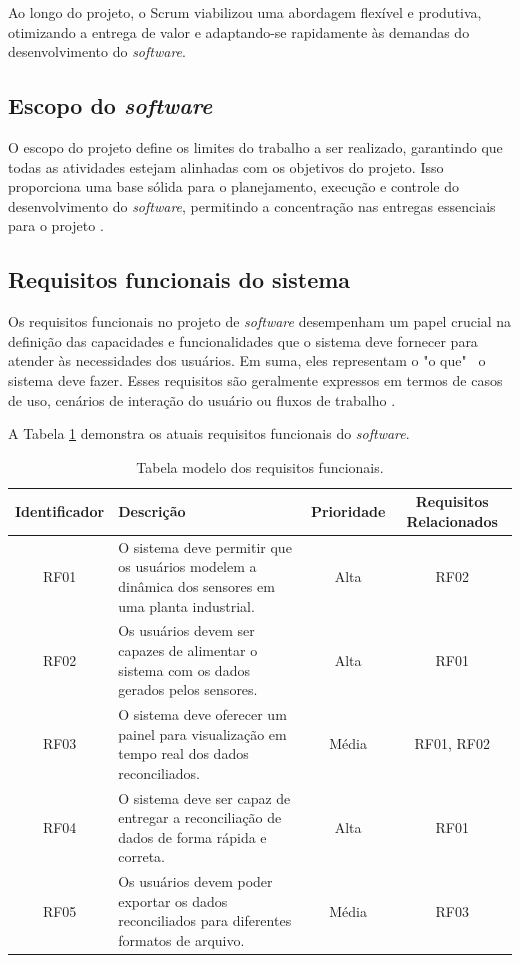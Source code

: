 Ao longo do projeto, o Scrum viabilizou uma abordagem flexível e produtiva, otimizando a entrega de valor e adaptando-se rapidamente às demandas do desenvolvimento do \textit{software}.

\subsection{Escopo do \textit{software}}

O escopo do projeto define os limites do trabalho a ser realizado, garantindo que todas as atividades estejam alinhadas com os objetivos do projeto. Isso proporciona uma base sólida para o planejamento, execução e controle do desenvolvimento do \textit{software}, permitindo a concentração nas entregas essenciais para o projeto \cite{softwareeng}.

\subsection{Requisitos funcionais do sistema}

Os requisitos funcionais no projeto de \textit{software} desempenham um papel crucial na definição das capacidades e funcionalidades que o sistema deve fornecer para atender às necessidades dos usuários. Em suma, eles representam o "o que" \ o sistema deve fazer. Esses requisitos são geralmente expressos em termos de casos de uso, cenários de interação do usuário ou fluxos de trabalho \cite{softwareengreq}.
        
A Tabela \ref{tab:req_funcional} demonstra os atuais requisitos funcionais do \textit{software}.

\begin{table}[htbp]
\centering
\begin{tabularx}{\linewidth}{|c|X|c|c|} \hline
\rowcolor[HTML]{C0C0C0} 
\textbf{Identificador} & \textbf{Descrição} & \textbf{Prioridade} & \textbf{Requisitos Relacionados} \\ \hline
RF01 & O sistema deve permitir que os usuários modelem a dinâmica dos sensores em uma planta industrial. & Alta & RF02 \\ \hline
RF02 & Os usuários devem ser capazes de alimentar o sistema com os dados gerados pelos sensores. & Alta & RF01 \\ \hline
RF03 & O sistema deve oferecer um painel para visualização em tempo real dos dados reconciliados. & Média & RF01, RF02 \\ \hline
RF04 & O sistema deve ser capaz de entregar a reconciliação de dados de forma rápida e correta. & Alta & RF01 \\ \hline
RF05 & Os usuários devem poder exportar os dados reconciliados para diferentes formatos de arquivo. & Média & RF03 \\ \hline
\end{tabularx}

\caption{Tabela modelo dos requisitos funcionais.}
\label{tab:req_funcional}
\end{table}

